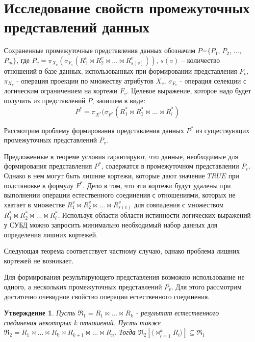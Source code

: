 \documentclass[10pt,a4paper]{article}
\newtheorem{statement}{Утверждение}
\def \n #1{\mathit{#1}}
\begin{document}
\section{Исследование свойств промежуточных представлений данных}

Сохраненные промежуточные представления данных обозначим $P$=$\{ P_1$, $P_2$, $\dots$, $P_m \}$,
где $P_v = \pi_{X_v}(\sigma_{F_v} (R^v_1 \Join R^v_2 \Join \dots \Join R^v_{s(v)} ))$,
$s(v)$ – количество отношений в базе данных, использованных при формировании представления $P_v$,
$\pi_{X_v}$ - операция проекции по множеству атрибутов $X_v$, $\sigma_{F_v}$ - операция селекции
с логическим ограничением на кортежи $F_v$.
Целевое выражение, которое надо будет получить из представлений $P$, запишем в виде:
$$P^{\ast} = \pi_{X^{\ast}}(\sigma_{F^{\ast}} (R^{\ast}_1 \Join R^{\ast}_2\Join \dots \Join R^{\ast}_l )$$

Рассмотрим проблему формирования представления данных $P^{\ast}$ из существующих промежуточных
представлений $P_v$.



Предложенные в теореме условия гарантируют, что данные, необходимые для формирования
представления $P^{\ast}$, содержатся в промежуточном представлении $P_v$. Однако в нем
могут быть лишние кортежи, которые дают значение $\n{TRUE}$ при подстановке в формулу
$F^{\ast}$. Дело в том, что эти кортежи будут удалены при выполнении операции естественного
соединения с отношениями, которых не хватает в множестве $R^v_1 \Join R^v_2 \Join \dots \Join R^v_{s(v)} $
для совпадения с множеством $R^{\ast}_1 \Join R^{\ast}_2\Join \dots \Join R^{\ast}_l $.
Используя области области истинности логических выражений у СУБД можно запросить
минимально необходимый набор данных для определения лишних кортежей.

Следующая теорема соответствует частному случаю, однако проблема лишних кортежей не возникает.



Для формирования результирующего представления возможно использование
не одного, а нескольких промежуточных представлений $P_v$. Для этого
рассмотрим достаточно очевидное свойство операции естественного соединения.

\begin{statement}
Пусть $\Re_1 = R_1 \Join \dots \Join R_k$ - результат естественного
соединения некоторых $k$ отношений. Пусть также $\Re_2 = R_1 \Join \dots
\Join R_k \Join R_{k+1} \Join \dots \Join R_{n}$. 
Тогда $\Re_2 [\langle \Join_{i=1}^{k} R_i \rangle] \subseteq \Re_1$
\label{join_property}
\end{statement}
\end{document}
